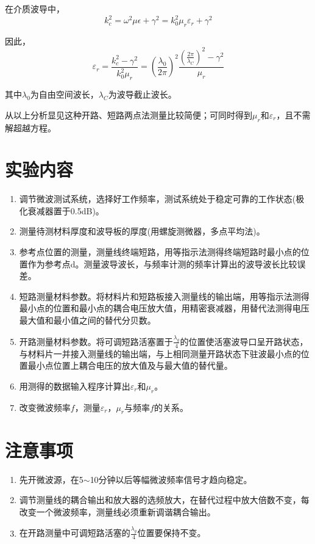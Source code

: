 \documentclass[a4paper]{article}
\begin{document}
在介质波导中，
$$k_c^2=\omega^2\mu\epsilon+\gamma^2=k_0^2\mu_r\varepsilon_r+\gamma^2$$

因此，
\begin{equation}
	\varepsilon_r=\frac{k_c^2-\gamma^2}{k_0^2\mu_r} = \left(\frac{\lambda_0}{2\pi}\right)^2\frac{\left(\frac{2\pi}{\lambda_C}\right)^2 - \gamma^2}{\mu_r}\label{eq17}
\end{equation}

其中$\lambda_0$为自由空间波长，$\lambda_C$为波导截止波长。

从以上分析显见这种开路、短路两点法测量比较简便；可同时得到$\mu_r$和$\varepsilon_r$，且不需解超越方程。

\section{实验内容}
\begin{enumerate}
	\item 调节微波测试系统，选择好工作频率，测试系统处于稳定可靠的工作状态(极化衰减器置于0.5dB)。
	\item 测量待测材料厚度和波导板的厚度(用螺旋测微器，多点平均法)。
	\item 参考点位置的测量，测量线终端短路，用等指示法测得终端短路时最小点的位置作为参考点d。测量波导波长，与频率计测的频率计算出的波导波长比较误差。
	\item 短路测量材料参数。将材料片和短路板接入测量线的输出端，用等指示法测得最小点的位置和最小点的耦合电压放大值，用精密衰减器，用替代法测得电压最大值和最小值之间的替代分贝数。
	\item 开路测量材料参数。将可调短路活塞置于$\frac{\lambda_g}{4}$的位置使活塞波导口呈开路状态，与材料片一并接入测量线的输出端，与上相同测量开路状态下驻波最小点的位置最小点位置上耦合电压的放大值及与最大值的替代量。
	\item 用测得的数据输入程序计算出$\varepsilon_r$和$\mu_r$。
	\item 改变微波频率$f$，测量$\varepsilon_r$，$\mu_r$与频率$f$的关系。
\end{enumerate}

\section{注意事项}
\begin{enumerate}
	\item 先开微波源，在5$\sim$10分钟以后等幅微波频率信号才趋向稳定。
	\item 调节测量线的耦合输出和放大器的选频放大，在替代过程中放大倍数不变，每改变一个微波频率，测量线必须重新调谐耦合输出。
	\item 在开路测量中可调短路活塞的$\frac{\lambda_g}{4}$位置要保持不变。
\end{enumerate}
\end{document}
